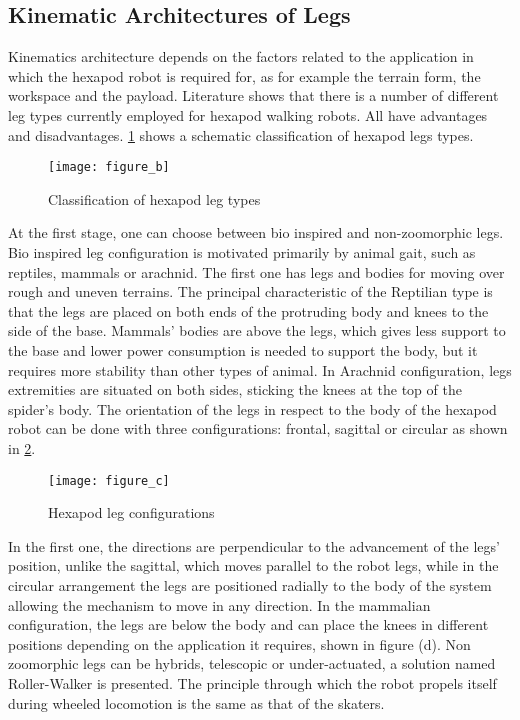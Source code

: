 \subsection{Kinematic Architectures of Legs}
Kinematics architecture depends on the factors related to the application in which the hexapod robot is required for, as for example the terrain form, the workspace and the payload. Literature shows that there is a number of different leg types currently employed for hexapod walking robots. All have advantages and disadvantages. \ref{figure b.png} shows a schematic classification of hexapod legs types.

\begin{figure}[h]
	\centering
	\texttt{[image: figure\_b]}
	\caption{Classification of hexapod leg types}
	\label{figure b.png}
\end{figure}

At the first stage, one can choose between bio inspired and non-zoomorphic legs. Bio inspired leg configuration is motivated primarily by animal gait, such as reptiles, mammals or arachnid. The first one has legs and bodies for moving over rough and uneven terrains. The principal characteristic of the Reptilian type is that the legs are placed on both ends of the protruding body and knees to the side of the base. Mammals’ bodies are above the legs, which gives less support to the base and lower power consumption is needed to support the body, but it requires more stability than other types of animal. In Arachnid configuration, legs extremities are situated on both sides, sticking the knees at the top of the spider’s body. The orientation of the legs in respect to the body of the hexapod robot can be done with three configurations: frontal, sagittal or circular as shown in \ref{figure c.png}.
\begin{figure}[h]
	\centering
	\texttt{[image: figure\_c]}
	\caption{Hexapod leg configurations}
	\label{figure c.png}
\end{figure}

In the first one, the directions are perpendicular to the advancement of the legs’ position, unlike the sagittal, which moves parallel to the robot legs, while in the circular arrangement the legs are positioned radially to the body of the system allowing the mechanism to move in any direction. In the mammalian configuration, the legs are below the body and can place the knees in different positions depending on the application it requires, shown in figure (d). Non zoomorphic legs can be hybrids, telescopic or under-actuated, a solution named Roller-Walker is presented. The principle through which the robot propels itself during wheeled locomotion is the same as that of the skaters.

